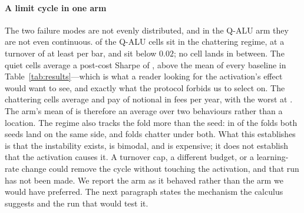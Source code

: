 \documentclass[conference]{IEEEtran}
\begin{document}
\paragraph{A limit cycle in one arm}
The two failure modes are not evenly distributed, and in the Q-ALU arm they are
not even continuous. \chatQalu{} of the \nCellsQalu{} Q-ALU cells sit in the
chattering regime, at a turnover of at least \turnChatMinQalu{} per bar, and
\nQuietQalu{} sit below $0.02$; no cell lands in between. The quiet cells average
a post-cost Sharpe of \srQuietQalu, above the mean of every baseline in
Table~\ref{tab:results}---which is what a reader looking for the activation's
effect would want to see, and exactly what the protocol forbids us to select on.
The chattering cells average \srChatQalu{} and pay \dragChatQalu{} of notional in
fees per year, with the worst at \srQaluMin. The arm's mean of \srQalu{} is
therefore an average over two behaviours rather than a location. The regime also
tracks the fold more than the seed: in \nFoldSameQalu{} of the \nFolds{} folds
both seeds land on the same side, and \nFoldChatQalu{} folds chatter under both.
What this establishes is that the instability exists, is bimodal, and is
expensive; it does not establish that the activation causes it. A turnover cap, a
different budget, or a learning-rate change could remove the cycle without
touching the activation, and that run has not been made. We report the arm as it
behaved rather than the arm we would have preferred. The next paragraph states
the mechanism the calculus suggests and the run that would test it.
\end{document}
